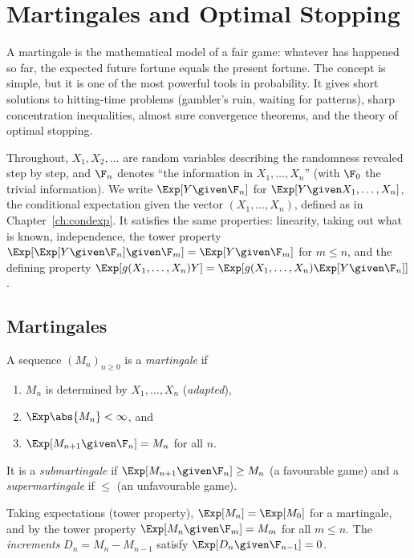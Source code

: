 \chapter{Martingales and Optimal Stopping}
\label{ch:mart}

A martingale is the mathematical model of a fair game: whatever has happened so far,
the expected future fortune equals the present fortune. The concept is simple, but it is
one of the most powerful tools in probability. It gives short solutions to hitting-time
problems (gambler's ruin, waiting for patterns), sharp concentration inequalities, almost
sure convergence theorems, and the theory of optimal stopping.

Throughout, $X_1,X_2,\dots$ are random variables describing the randomness revealed
step by step, and $\F_n$ denotes ``the information in $X_1,\dots,X_n$'' (with $\F_0$ the
trivial information). We write $\Exp[Y\given\F_n]$ for $\Exp[Y\given X_1,\dots,X_n]$, the
conditional expectation given the vector $(X_1,\dots,X_n)$, defined as in
Chapter~\ref{ch:condexp}. It satisfies the same properties: linearity, taking out what is
known, independence, the tower property
$\Exp[\Exp[Y\given\F_n]\given\F_m]=\Exp[Y\given\F_m]$ for $m\le n$, and the defining
property $\Exp[g(X_1,\dots,X_n)Y]=\Exp[g(X_1,\dots,X_n)\Exp[Y\given\F_n]]$.

\section{Martingales}

\begin{definition}[Martingale]
A sequence $(M_n)_{n\ge0}$ is a \emph{martingale} if
\begin{enumerate}[label=(\roman*)]
\item $M_n$ is determined by $X_1,\dots,X_n$ (\emph{adapted}),
\item $\Exp\abs{M_n}<\infty$, and
\item $\Exp[M_{n+1}\given\F_n]=M_n$ for all $n$.
\end{enumerate}
It is a \emph{submartingale} if $\Exp[M_{n+1}\given\F_n]\ge M_n$ (a favourable game) and a
\emph{supermartingale} if $\le$ (an unfavourable game).
\end{definition}

Taking expectations (tower property), $\Exp[M_n]=\Exp[M_0]$ for a martingale, and by the
tower property $\Exp[M_n\given\F_m]=M_m$ for all $m\le n$. The \emph{increments}
$D_n=M_n-M_{n-1}$ satisfy $\Exp[D_n\given\F_{n-1}]=0$.


